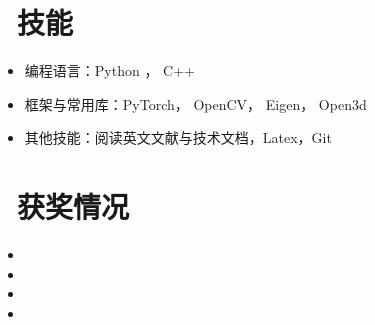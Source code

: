 \documentclass{resume}
\begin{document}
\section{\faCogs\ 技能}
\begin{itemize} [parsep=0.5ex]
  \item 编程语言：Python ， C++
  \item 框架与常用库：PyTorch， OpenCV， Eigen， Open3d
  \item 其他技能：阅读英文文献与技术文档，Latex，Git
\end{itemize}

\section{\faTrophy\ 获奖情况}
\begin{itemize}
    \item{}
    \item{}
    \item{}
    \item {}
\end{itemize}
\end{document}
